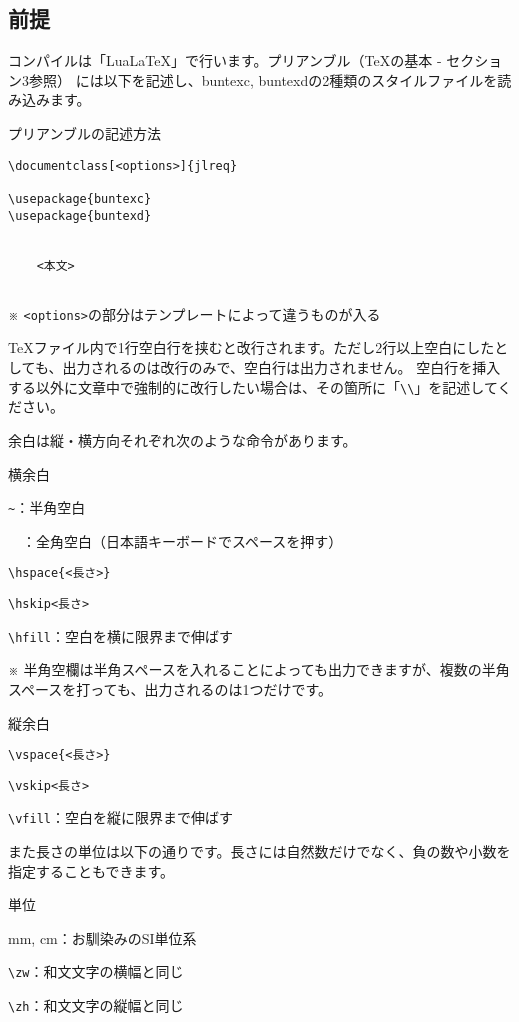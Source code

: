 \begin{multicols*}{2}
\section{前提}
コンパイルは「Lua\LaTeX 」で行います。プリアンブル（\TeX の基本 - セクション3参照）
には以下を記述し、buntexc, buntexdの2種類のスタイルファイルを読み込みます。
\begin{framebox-simple}{プリアンブルの記述方法}
\begin{verbatim}
\documentclass[<options>]{jlreq}

\usepackage{buntexc}
\usepackage{buntexd}


    <本文>


\end{verbatim}
※ \verb|<options>|の部分はテンプレートによって違うものが入る
\end{framebox-simple}
\TeX ファイル内で1行空白行を挟むと改行されます。ただし2行以上空白にしたとしても、出力されるのは改行のみで、空白行は出力されません。
空白行を挿入する以外に文章中で強制的に改行したい場合は、その箇所に「\verb|\\|」を記述してください。

余白は縦・横方向それぞれ次のような命令があります。
\begin{framebox-simple}{横余白}
\begin{reitemize}
    \item \verb|~|：半角空白
    \item 　：全角空白（日本語キーボードでスペースを押す）
    \item \verb|\hspace{<長さ>}|
    \item \verb|\hskip<長さ>|
    \item \verb|\hfill|：空白を横に限界まで伸ばす
\end{reitemize}
※ 半角空欄は半角スペースを入れることによっても出力できますが、複数の半角スペースを打っても、出力されるのは1つだけです。
\end{framebox-simple}
\begin{framebox-simple}{縦余白}
    \begin{reitemize}
        \item \verb|\vspace{<長さ>}|
        \item \verb|\vskip<長さ>|
        \item \verb|\vfill|：空白を縦に限界まで伸ばす
    \end{reitemize}
\end{framebox-simple}
また長さの単位は以下の通りです。長さには自然数だけでなく、負の数や小数を指定することもできます。
\begin{framebox-simple}{単位}
    \begin{reitemize}
        \item mm, cm：お馴染みのSI単位系
        \item \verb|\zw|：和文文字の横幅と同じ
        \item \verb|\zh|：和文文字の縦幅と同じ
    \end{reitemize}
\end{framebox-simple}


\end{multicols*}
